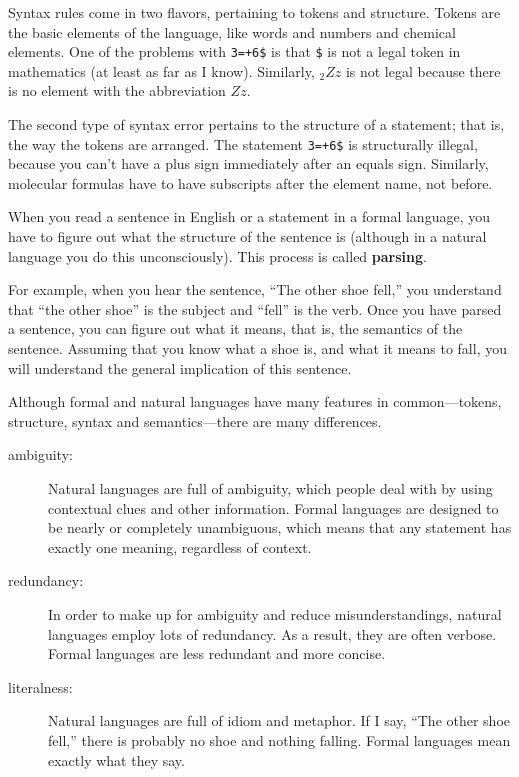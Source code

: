 Syntax rules come in two flavors, pertaining to tokens and structure.
Tokens are the basic elements of the language, like words and numbers
and chemical elements.  One of the problems with {\tt 3=+6\$} is that
{\tt \$} is not a legal token in mathematics (at least as far as I
know).  Similarly, $_2Zz$ is not legal because there is no element with
the abbreviation $Zz$.

The second type of syntax error pertains to the structure of a
statement; that is, the way the tokens are arranged.  The statement
{\tt 3=+6\$} is structurally illegal, because you can't have a plus
sign immediately after an equals sign.  Similarly, molecular formulas
have to have subscripts after the element name, not before.

When you read a sentence in English or a statement in a formal
language, you have to figure out what the structure of the sentence is
(although in a natural language you do this unconsciously).  This
process is called {\bf parsing}.


For example, when you hear the sentence, ``The other shoe fell,'' you
understand that ``the other shoe'' is the subject and ``fell'' is the
verb.  Once you have parsed a sentence, you can figure out what it
means, that is, the semantics of the sentence.  Assuming that you know
what a shoe is, and what it means to fall, you will understand the
general implication of this sentence.

Although formal and natural languages have many features in
common---tokens, structure, syntax and semantics---there are many
differences.


\begin{description}

\item[ambiguity:] Natural languages are full of ambiguity, which
people deal with by using contextual clues and other information.
Formal languages are designed to be nearly or completely unambiguous,
which means that any statement has exactly one meaning,
regardless of context.

\item[redundancy:] In order to make up for ambiguity and reduce
misunderstandings, natural languages employ lots of
redundancy.  As a result, they are often verbose.  Formal languages
are less redundant and more concise.

\item[literalness:] Natural languages are full of idiom and
metaphor.  If I say, ``The other shoe fell,'' there is probably
no shoe and nothing falling.  Formal languages mean
exactly what they say.

\end{description}

